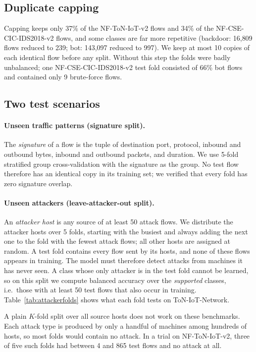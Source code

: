\documentclass[pdflatex,sn-mathphys-num]{sn-jnl}
\begin{document}
\subsection{Duplicate capping}\label{sec:dups}

Capping keeps only 37\% of the NF-ToN-IoT-v2 flows and 34\% of the NF-CSE-CIC-IDS2018-v2 flows, and some classes are far more repetitive (backdoor: 16{,}809 flows reduced to 239; bot: 143{,}097 reduced to 997). We keep at most 10 copies of each identical flow before any split. Without this step the folds were badly unbalanced; one NF-CSE-CIC-IDS2018-v2 test fold consisted of 66\% bot flows and contained only 9 brute-force flows.

\subsection{Two test scenarios}\label{sec:splits}

\paragraph{Unseen traffic patterns (signature split).} The \emph{signature} of a flow is the tuple of destination port, protocol, inbound and outbound bytes, inbound and outbound packets, and duration. We use 5-fold stratified group cross-validation with the signature as the group. No test flow therefore has an identical copy in its training set; we verified that every fold has zero signature overlap.

\paragraph{Unseen attackers (leave-attacker-out split).} An \emph{attacker host} is any source of at least 50 attack flows. We distribute the attacker hosts over 5 folds, starting with the busiest and always adding the next one to the fold with the fewest attack flows; all other hosts are assigned at random. A test fold contains every flow sent by its hosts, and none of these flows appears in training. The model must therefore detect attacks from machines it has never seen. A class whose only attacker is in the test fold cannot be learned, so on this split we compute balanced accuracy over the \emph{supported} classes, i.e.\ those with at least 50 test flows that also occur in training. Table~\ref{tab:attackerfolds} shows what each fold tests on ToN-IoT-Network.

A plain $K$-fold split over all source hosts does not work on these benchmarks. Each attack type is produced by only a handful of machines among hundreds of hosts, so most folds would contain no attack. In a trial on NF-ToN-IoT-v2, three of five such folds had between 4 and 865 test flows and no attack at all.
\end{document}
